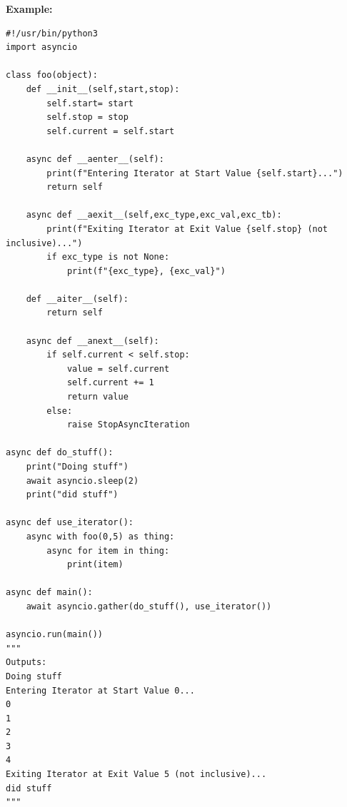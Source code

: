 \documentclass{report}
\begin{document}
    \begin{mdframed}
      \textbf{Example: }
      \begin{verbatim}
#!/usr/bin/python3
import asyncio

class foo(object):
    def __init__(self,start,stop):
        self.start= start
        self.stop = stop
        self.current = self.start

    async def __aenter__(self):
        print(f"Entering Iterator at Start Value {self.start}...")
        return self

    async def __aexit__(self,exc_type,exc_val,exc_tb):
        print(f"Exiting Iterator at Exit Value {self.stop} (not inclusive)...")
        if exc_type is not None:
            print(f"{exc_type}, {exc_val}")

    def __aiter__(self):
        return self

    async def __anext__(self):
        if self.current < self.stop:
            value = self.current
            self.current += 1
            return value
        else:
            raise StopAsyncIteration

async def do_stuff():
    print("Doing stuff")
    await asyncio.sleep(2)
    print("did stuff")

async def use_iterator():
    async with foo(0,5) as thing:
        async for item in thing:
            print(item)

async def main():
    await asyncio.gather(do_stuff(), use_iterator())

asyncio.run(main())
"""
Outputs:
Doing stuff
Entering Iterator at Start Value 0...
0
1
2
3
4
Exiting Iterator at Exit Value 5 (not inclusive)...
did stuff
"""
      \end{verbatim}
    \end{mdframed}
    \bigbreak \noindent 

    \bigbreak \noindent \bigbreak \noindent 
\end{document}
